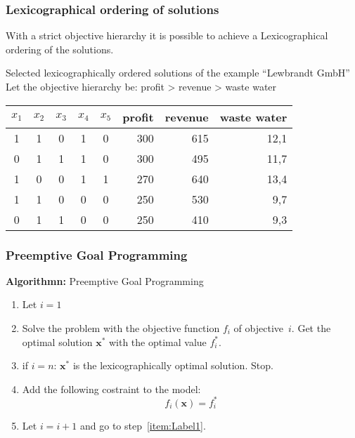 \begin{frame}
 \frametitle{Lexicographical ordering of solutions}
 With a strict objective hierarchy it is possible to achieve a Lexicographical ordering of the solutions.
 
 \begin{block}{Selected lexicographically ordered solutions of the example ``Lewbrandt GmbH''}
 Let the objective hierarchy be: profit > revenue > waste water\par
 \footnotesize
 \centering
 \begin{tabular}{*{5}{c}rrr}
  \toprule
  $x_1$ & $x_2$ & $x_3$ & $x_4$ & $x_5$ & \scriptsize profit & \scriptsize revenue & \scriptsize waste water\\
  \midrule
  1&	1&	0&	1&	0&	300&	615&	12,1\\
  0&	1&	1&	1&	0&	300&	495&	11,7\\
  1&	0&	0&	1&	1&	270&	640&	13,4\\
  1&	1&	0&	0&	0&	250&	530&	9,7\\
  0&	1&	1&	0&	0&	250&	410&	9,3\\
  \bottomrule
 \end{tabular}
 \end{block}
\end{frame}

\begin{frame}
 \frametitle{Preemptive Goal Programming}
 \textbf{Algorithmn:} Preemptive Goal Programming
  \addtolength{\abovedisplayskip}{-2ex}
  \addtolength{\belowdisplayskip}{-2ex}
  \begin{enumerate}
  \item Let $i=1$
  \item \label{item:Label1} Solve the problem with the objective function $f_i$ of objective~$i$. Get the optimal solution $\mathbf{x}^*$ with the optimal value $f_i^*$.
  \item if $i=n$: $\mathbf{x}^*$ is the lexicographically optimal solution. Stop.
  \item Add the following costraint to the model: \[f_i(\mathbf{x}) = f_i^*\]
  \item Let $i=i+1$ and go to step~\ref{item:Label1}.
  \end{enumerate}
  \addtolength{\abovedisplayskip}{2ex}
  \addtolength{\belowdisplayskip}{2ex}
\end{frame}



